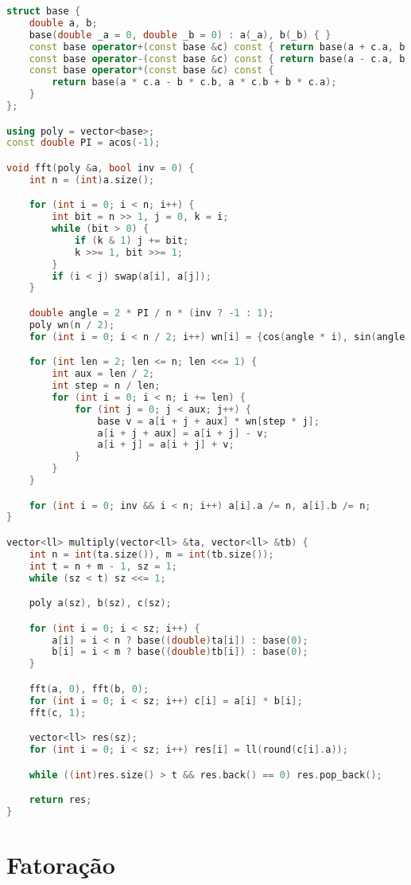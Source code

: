 \documentclass[10pt, a4paper, oneside]{book}
\begin{document}
\begin{lstlisting}[language=C++]
struct base {
    double a, b;
    base(double _a = 0, double _b = 0) : a(_a), b(_b) { }
    const base operator+(const base &c) const { return base(a + c.a, b + c.b); }
    const base operator-(const base &c) const { return base(a - c.a, b - c.b); }
    const base operator*(const base &c) const {
        return base(a * c.a - b * c.b, a * c.b + b * c.a);
    }
};

using poly = vector<base>;
const double PI = acos(-1);

void fft(poly &a, bool inv = 0) {
    int n = (int)a.size();

    for (int i = 0; i < n; i++) {
        int bit = n >> 1, j = 0, k = i;
        while (bit > 0) {
            if (k & 1) j += bit;
            k >>= 1, bit >>= 1;
        }
        if (i < j) swap(a[i], a[j]);
    }

    double angle = 2 * PI / n * (inv ? -1 : 1);
    poly wn(n / 2);
    for (int i = 0; i < n / 2; i++) wn[i] = {cos(angle * i), sin(angle * i)};

    for (int len = 2; len <= n; len <<= 1) {
        int aux = len / 2;
        int step = n / len;
        for (int i = 0; i < n; i += len) {
            for (int j = 0; j < aux; j++) {
                base v = a[i + j + aux] * wn[step * j];
                a[i + j + aux] = a[i + j] - v;
                a[i + j] = a[i + j] + v;
            }
        }
    }

    for (int i = 0; inv && i < n; i++) a[i].a /= n, a[i].b /= n;
}

vector<ll> multiply(vector<ll> &ta, vector<ll> &tb) {
    int n = int(ta.size()), m = int(tb.size());
    int t = n + m - 1, sz = 1;
    while (sz < t) sz <<= 1;

    poly a(sz), b(sz), c(sz);

    for (int i = 0; i < sz; i++) {
        a[i] = i < n ? base((double)ta[i]) : base(0);
        b[i] = i < m ? base((double)tb[i]) : base(0);
    }

    fft(a, 0), fft(b, 0);
    for (int i = 0; i < sz; i++) c[i] = a[i] * b[i];
    fft(c, 1);

    vector<ll> res(sz);
    for (int i = 0; i < sz; i++) res[i] = ll(round(c[i].a));

    while ((int)res.size() > t && res.back() == 0) res.pop_back();

    return res;
}
\end{lstlisting}
\hfill

\section{Fatoração}
\end{document}
